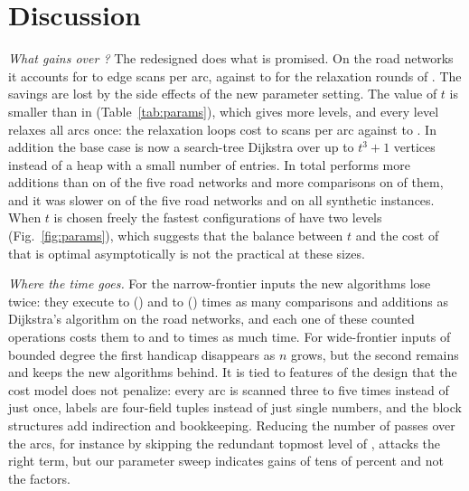 \section{Discussion}\label{sec:discussion}
\emph{What \bmB{} gains over \bmA?} The redesigned \fp{} does what is promised. On the road
networks it accounts for \PivotScanMinTwoSix{} to \PivotScanMaxTwoSix{} edge scans per arc,
against \PivotScanMinTwoFive{} to \PivotScanMaxTwoFive{} for the relaxation rounds of \bmA. The
savings are lost by the side effects of the new parameter setting. The value of $t$ is smaller
than in \bmA{} (Table~\ref{tab:params}), which gives more levels, and every level relaxes all arcs
once: the relaxation loops cost \MainScanMinTwoSix{} to \MainScanMaxTwoSix{} scans per arc against
\MainScanMinTwoFive{} to \MainScanMaxTwoFive. In addition the base case is now a search-tree
Dijkstra over up to $t^3+1$ vertices instead of a heap with a small number of entries. In total
\bmB{} performs more additions than \bmA{} on \RoadsMoreAddsTwoSix{} of the five road networks and
more comparisons on \RoadsMoreCmpTwoSix{} of them, and it was slower on \RealTwoSixSlowerWord{} of
the five road networks and on all synthetic instances. When $t$ is chosen freely the fastest
configurations of \bmB{} have two levels (Fig.~\ref{fig:params}), which suggests that the balance
between $t$ and the cost of \fp{} that is optimal asymptotically is not the practical at these
sizes.

\emph{Where the time goes.} For the narrow-frontier inputs the new algorithms lose twice: they
execute \OpsRatioMinTwoFive{} to \OpsRatioMaxTwoFive{} (\bmA) and \OpsRatioMinTwoSix{} to
\OpsRatioMaxTwoSix{} (\bmB) times as many comparisons and additions as Dijkstra's algorithm on
the road networks, and each one of these counted operations costs them \PerOpMinTwoFive{} to
\PerOpMaxTwoFive{} and \PerOpMinTwoSix{} to \PerOpMaxTwoSix{} times as much time. For
wide-frontier inputs of bounded degree the first handicap disappears as $n$ grows, but the second
remains and keeps the new algorithms behind. It is tied to features of the design that the cost
model does not penalize: every arc is scanned three to five times instead of just once, labels
are four-field tuples instead of just single numbers, and the block structures add indirection
and bookkeeping. Reducing the number of passes over the arcs, for instance by skipping the
redundant topmost level of \bmB, attacks the right term, but our parameter sweep indicates gains
of tens of percent and not the factors.

